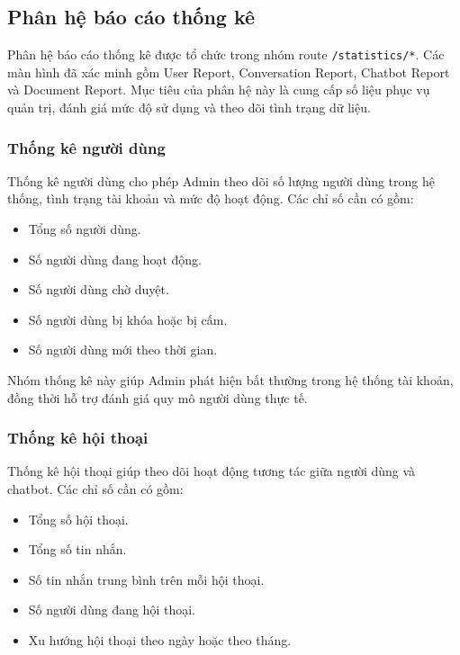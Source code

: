 \subsection{Phân hệ báo cáo thống kê}

Phân hệ báo cáo thống kê được tổ chức trong nhóm route \texttt{/statistics/*}. Các màn hình đã xác minh gồm User Report, Conversation Report, Chatbot Report và Document Report. Mục tiêu của phân hệ này là cung cấp số liệu phục vụ quản trị, đánh giá mức độ sử dụng và theo dõi tình trạng dữ liệu.

\subsubsection{Thống kê người dùng}

Thống kê người dùng cho phép Admin theo dõi số lượng người dùng trong hệ thống, tình trạng tài khoản và mức độ hoạt động. Các chỉ số cần có gồm:

\begin{itemize}
    \item Tổng số người dùng.
    \item Số người dùng đang hoạt động.
    \item Số người dùng chờ duyệt.
    \item Số người dùng bị khóa hoặc bị cấm.
    \item Số người dùng mới theo thời gian.
\end{itemize}

Nhóm thống kê này giúp Admin phát hiện bất thường trong hệ thống tài khoản, đồng thời hỗ trợ đánh giá quy mô người dùng thực tế.

\subsubsection{Thống kê hội thoại}

Thống kê hội thoại giúp theo dõi hoạt động tương tác giữa người dùng và chatbot. Các chỉ số cần có gồm:

\begin{itemize}
    \item Tổng số hội thoại.
    \item Tổng số tin nhắn.
    \item Số tin nhắn trung bình trên mỗi hội thoại.
    \item Số người dùng đang hội thoại.
    \item Xu hướng hội thoại theo ngày hoặc theo tháng.
\end{itemize}

